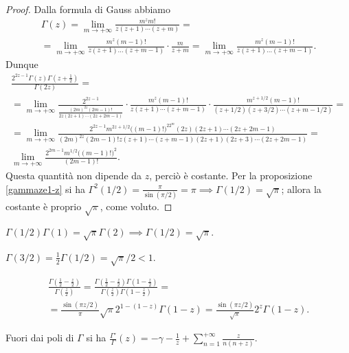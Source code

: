 \begin{proof}
  Dalla formula di Gauss abbiamo
  \begin{gather*}
    \Gamma(z)=\lim_{m \longrightarrow +\infty} \frac{m^zm!}{z(z+1)\cdots(z+m)}= \\
    =\lim_{m \longrightarrow+\infty}\frac{m^z(m-1)!}{z(z+1)\dots(z+m-1)}\cdot\frac{m}{z+m}=\lim_{m \longrightarrow+\infty}\frac{m^z(m-1)!}{z(z+1)\dots(z+m-1)}.
  \end{gather*}
  Dunque
  \begin{gather*}
    \frac{2^{2z-1}\Gamma(z)\Gamma\left(z+\frac{1}{2}\right)}{\Gamma(2z)}=\\
    =\lim_{m \longrightarrow +\infty} \frac{2^{2z-1}}{\frac{(2m)^{2z}(2m-1)!}{2z(2z+1)\cdots(2z+2m-1)}}\cdot\frac{m^z(m-1)!}{z(z+1)\cdots(z+m-1)}\cdot\frac{m^{z+1/2}(m-1)!}{(z+1/2)(z+3/2)\cdots(z+m-1/2)}=\\
    =\lim_{m \longrightarrow +\infty} \frac{2^{2z-1}m^{2z+1/2}\big((m-1)!\big)^22^m(2z)(2z+1)\cdots(2z+2m-1)}{(2m)^{2z}(2m-1)!z(z+1)\cdots(z+m-1)(2z+1)(2z+3)\cdots(2z+2m-1)}= \\
    \lim_{m \longrightarrow +\infty} \frac{2^{2m-1}m^{1/2}\big((m-1)!\big)^2}{(2m-1)!}.
  \end{gather*}
  Questa quantità non dipende da $z$, perciò è costante. Per la proposizione \ref{gammaze1-z} si ha $\Gamma^2(1/2)=\frac{\pi}{\sin(\pi/2)}=\pi \implies \Gamma(1/2)=\sqrt{\pi}$; allora la costante è proprio $\sqrt{\pi}$, come voluto.
\end{proof}

\begin{oss}
  $\Gamma(1/2)\Gamma(1)=\sqrt{\pi}\Gamma(2) \implies \Gamma(1/2)=\sqrt{\pi}$.

  $\Gamma(3/2)=\frac{1}{2}\Gamma(1/2)=\sqrt{\pi}/2<1$.
\end{oss}

\begin{oss}
  \begin{gather*}
    \frac{\Gamma\left(\frac{1}{2}-\frac{z}{2}\right)}{\Gamma\left(\frac{z}{2}\right)}=\frac{\Gamma\left(\frac{1}{2}-\frac{z}{2}\right)\Gamma\left(1-\frac{z}{2}\right)}{\Gamma\left(\frac{z}{2}\right)\Gamma\left(1-\frac{z}{2}\right)}=\\
    =\frac{\sin(\pi z/2)}{\pi}\sqrt{\pi}2^{1-(1-z)}\Gamma(1-z)=\frac{\sin(\pi z/2)}{\sqrt{\pi}}2^z\Gamma(1-z).
  \end{gather*}
\end{oss}

\begin{prop} \label{Gammagamma}
  Fuori dai poli di $\Gamma$ si ha $\displaystyle \frac{\Gamma'}{\Gamma}(z)=-\gamma-\frac{1}{z}+\sum_{n=1}^{+\infty} \frac{z}{n(n+z)}$.
\end{prop}

